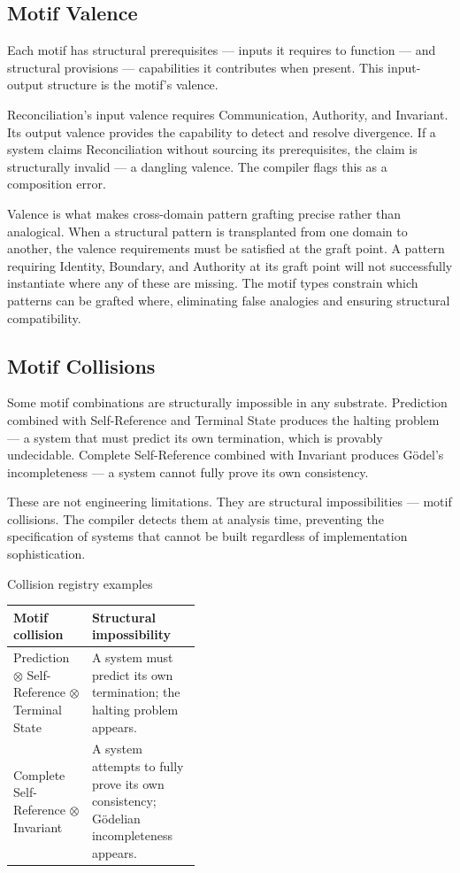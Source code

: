 \documentclass[11pt,a4paper]{article}
\newcommand{\comp}{\mathbin{\otimes}}
\begin{document}
\subsection{Motif Valence}

Each motif has structural prerequisites --- inputs it requires to function --- and structural provisions --- capabilities it contributes when present. This input-output structure is the motif's valence.

Reconciliation's input valence requires Communication, Authority, and Invariant. Its output valence provides the capability to detect and resolve divergence. If a system claims Reconciliation without sourcing its prerequisites, the claim is structurally invalid --- a dangling valence. The compiler flags this as a composition error.

Valence is what makes cross-domain pattern grafting precise rather than analogical. When a structural pattern is transplanted from one domain to another, the valence requirements must be satisfied at the graft point. A pattern requiring Identity, Boundary, and Authority at its graft point will not successfully instantiate where any of these are missing. The motif types constrain which patterns can be grafted where, eliminating false analogies and ensuring structural compatibility.

\subsection{Motif Collisions}

Some motif combinations are structurally impossible in any substrate. Prediction combined with Self-Reference and Terminal State produces the halting problem --- a system that must predict its own termination, which is provably undecidable. Complete Self-Reference combined with Invariant produces G\"odel's incompleteness --- a system cannot fully prove its own consistency.

These are not engineering limitations. They are structural impossibilities --- motif collisions. The compiler detects them at analysis time, preventing the specification of systems that cannot be built regardless of implementation sophistication.

\begin{diagnosticbox}{Collision registry examples}
\begin{tabularx}{\linewidth}{@{}L{0.42\linewidth}Y@{}}
\toprule
\textbf{Motif collision} & \textbf{Structural impossibility} \\
\midrule
Prediction $\comp$ Self-Reference $\comp$ Terminal State & A system must predict its own termination; the halting problem appears. \\
Complete Self-Reference $\comp$ Invariant & A system attempts to fully prove its own consistency; G\"odelian incompleteness appears. \\
\bottomrule
\end{tabularx}
\end{diagnosticbox}
\end{document}
